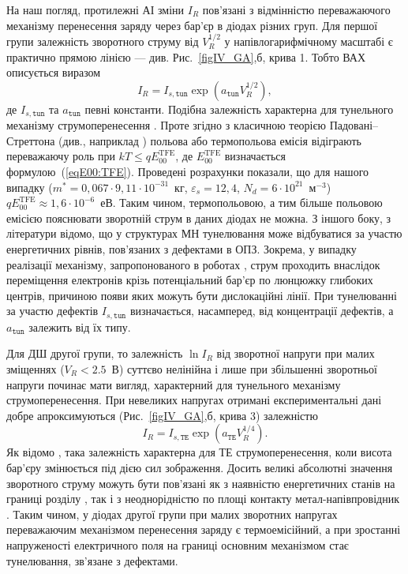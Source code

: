 На наш погляд, протилежні АІ зміни $I_R$ пов’язані з відмінністю переважаючого механізму перенесення заряду через бар'єр в діодах різних груп.
Для першої групи залежність зворотного струму від $V_R^{1/2}$ у напівлогарифмічному масштабі є практично прямою лінією --- див. Рис.~\ref{figIV_GA},б, крива 1.
Тобто ВАХ описується виразом
\begin{equation}\label{eqIR1:GA}
I_R=I_{s,\mathtt{tun}}\exp\left(a_\mathtt{tun}V_R^{1/2}\right),
\end{equation}
де
$I_{s,\mathtt{tun}}$ та $a_\mathtt{tun}$ певні константи.
Подібна залежність характерна для тунельного механізму струмоперенесення \cite{Rhoderick1988}.
Проте згідно з класичною теорією Падовані--Стреттона (див., наприклад \cite{Rhoderick1988,Singh1994}) польова або термопольова емісія відіграють
переважаючу роль при $kT\leq qE_{00}^\mathrm{TFE}$,
де $E_{00}^\mathrm{TFE}$ визначається формулою~(\ref{eqE00:TFE}).
Проведені розрахунки показали, що для нашого випадку ($m^*=0,067\cdot9,11\cdot10^{-31}$~кг,
$\varepsilon_s=12,4$, $N_d=6\cdot10^{21}$~м$^{-3}$) $qE_{00}^\mathrm{TFE}\approx1,6\cdot10^{-6}$~еВ.
Таким чином, термопольовою, а тим більше польовою емісією пояснювати зворотній струм в даних діодах не можна.
З іншого боку, з літератури \cite{Evstropov,Evstropov2000,Ganichev:2000,PipinsFTP,Pipinys1999} відомо, що у структурах МН тунелювання може відбуватися за участю енергетичних рівнів, пов'язаних з дефектами в ОПЗ.
Зокрема, у випадку реалізації механізму, запропонованого в роботах \cite{Evstropov,Evstropov2000}, струм проходить внаслідок переміщення електронів
крізь потенціальний бар'єр по люнцюжку глибоких центрів, причиною появи яких можуть бути дислокаційні лінії.
При тунелюванні за участю дефектів $I_{s,\mathtt{tun}}$ визначається, насамперед, від концентрації дефектів,
а $a_\mathtt{tun}$ залежить від їх типу.

Для ДШ другої групи, то залежність $\ln I_R$ від зворотної напруги при малих зміщеннях ($V_R<2.5$~В) суттєво нелінійна
і лише при збільшенні зворотньої напруги починає мати вигляд, характерний для тунельного механізму струмоперенесення.
При невеликих напругах отримані експериментальні дані добре апроксимуються (Рис.~\ref{figIV_GA},б, крива 3) залежністю
\begin{equation}\label{eqIR2:GA}
I_R=I_{s,\mathtt{TE}}\exp\left(a_\mathtt{TE}V_R^{1/4}\right).
\end{equation}
Як відомо \cite{Rhoderick1988},
така залежність характерна для ТЕ струмоперенесення, коли висота бар’єру змінюється під дією сил зображення.
Досить великі абсолютні значення зворотного струму можуть бути пов’язані як з наявністю енергетичних станів на границі розділу \cite{Singh1994,Tseng1987}, так і з неоднорідністю по площі контакту метал-напівпровідник \cite{Askerov:PhD}.
Таким чином, у діодах другої групи при малих зворотних напругах переважаючим механізмом перенесення заряду є термоемісійний, а при зростанні напруженості електричного поля на границі основним механізмом стає тунелювання, зв'язане з дефектами.


